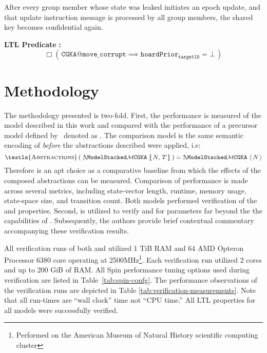 \documentclass[authordraft,sigconf]{acmart}
\newcommand{\Abrev}[1]{\gls{#1}}
\newcommand{\Parens}[1]{\ensuremath{\left(\;#1\;\right)}\xspace}
\begin{document}
\begin{definition}
After every group member whose state was leaked initiates an epoch update, and that update instruction message is processed by all group members, the shared key becomes confidential again.
\end{definition}%
\noindent\textbf{LTL Predicate} \textbf{:}%
{\small%
\[%
\Box \left(\, \texttt{CGKA@move\_corrupt} \implies \texttt{hoardPrior}_{\texttt{targetID}} = \bot \,\right)%
\]%
}

\newcommand{\CompressedMonospace}[1]{%
{\textls{\textsc{#1}}}\xspace%
}%
\newcommand{\Code}[1]{\CompressedMonospace{#1}\xspace}

\section{Methodology}

The methodology presented is two-fold.
First, the performance is measured of the model  described in this work and compared with the performance of a precursor model defined by~\cite{washburn2022formal} 
denoted as .
The comparison model  is the same semantic encoding of  \emph{before} the abstractions described were applied, i.e:  $$\Code{Abstractions}\Parens{\CGKAmodNT{N}{T}} =  \CGKAmodN{N}$$
Therefore  is an apt choice as a comparative baseline from which the effects of the composed abstractions can be measured.
Comparison of performance is made across several metrics, including state-vector length, runtime, memory usage, state-space size, and transition count.
Both models performed verification of the  and  properties.
Second,  is utilized to verify  and  for parameters far beyond the the capabilities of .
Subsequently, the authors provide brief contextual commentary accompanying these verification results.

All verification runs of both  and  utilized 1 TiB RAM and \(64\) AMD Opteron Processor 6380 core operating at 2500MHz\footnote{Performed on the American Museum of Natural History scientific computing cluster}.
Each verification run utilized 2 cores and up to 200 GiB of RAM.
All Spin performance tuning options used during verification are listed in Table~\ref{tab:spin-confg}.
The performance observations of the verification runs are depicted in Table \ref{tab:verification-measurements}.
Note that all run-times are ``wall clock'' time not ``CPU time.''
All \Abrev{LTL} properties for all models were successfully verified.
\end{document}
